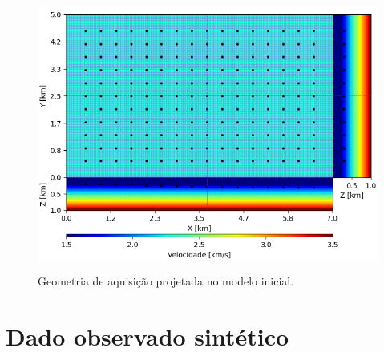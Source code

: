 \begin{figure}[H]
	\centering
	\includegraphics[width=12cm,height=9cm]{Imgs/Metodologia/init_model_geometry.png}
	\caption{Geometria de aquisição projetada no modelo inicial.}
	\label{fig:init_model_geometry}	
\end{figure}




\section{Dado observado sintético}


